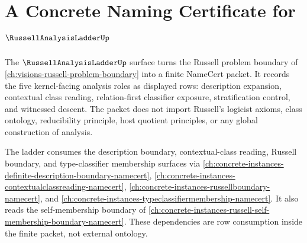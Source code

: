 \chapter{A Concrete Naming Certificate for $\RussellAnalysisLadderUp$}
\label{ch:concrete-instances-russellanalysisladder-namecert}


The $\RussellAnalysisLadderUp$ surface turns the Russell problem boundary of \autoref{ch:visions-russell-problem-boundary} into a finite NameCert packet. It records the five kernel-facing analysis roles as displayed rows: description expansion, contextual class reading, relation-first classifier exposure, stratification control, and witnessed descent. The packet does not import Russell's logicist axioms, class ontology, reducibility principle, host quotient principles, or any global construction of analysis.

The ladder consumes the description boundary, contextual-class reading, Russell boundary, and type-classifier membership surfaces via \autoref{ch:concrete-instances-definite-description-boundary-namecert}, \autoref{ch:concrete-instances-contextualclassreading-namecert}, \autoref{ch:concrete-instances-russellboundary-namecert}, and \autoref{ch:concrete-instances-typeclassifiermembership-namecert}. It also reads the self-membership boundary of \autoref{ch:concrete-instances-russell-self-membership-boundary-namecert}. These dependencies are row consumption inside the finite packet, not external ontology.

